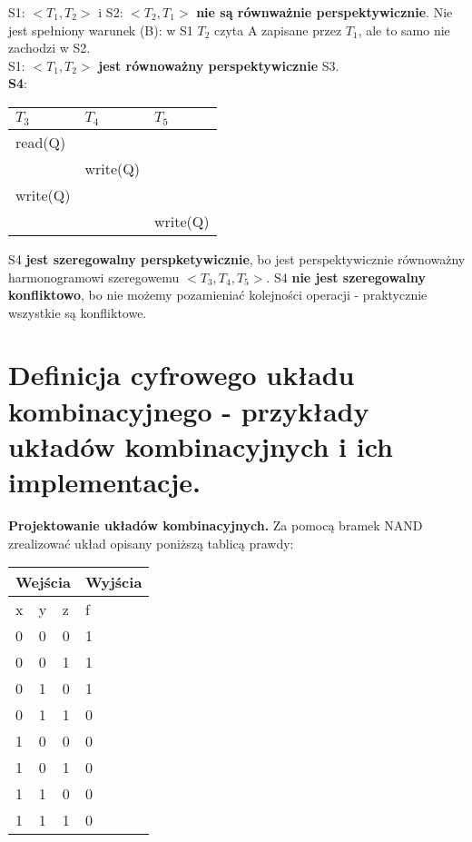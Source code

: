 \documentclass[main.tex]{subfiles}
\begin{document}
    S1: $<T_1, T_2>$ i S2: $<T_2, T_1>$ \textbf{nie są równważnie perspektywicznie}. Nie jest spełniony warunek (B):
    w S1 $T_2$ czyta A zapisane przez $T_1$, ale to samo nie zachodzi w S2.\\

    S1: $<T_1, T_2>$ \textbf{jest równoważny perspektywicznie} S3.\\

    \noindent \textbf{S4}:
    \begin{table}[H]
        \begin{center}
            \begin{tabular}{| p{4cm} | p{4cm} | p{4cm} |}
                \hline
                $T_3$ & $T_4$ & $T_5$\\
                \hline
                \hline
                read(Q) &&\\
                \hline
                & write(Q) &\\
                \hline
                write(Q) &&\\
                \hline
                && write(Q)\\
                \hline
            \end{tabular}
        \end{center}
    \end{table}

    S4 \textbf{jest szeregowalny perspketywicznie}, bo jest perspektywicznie równoważny harmonogramowi szeregowemu
    $<T_3, T_4, T_5>$. S4 \textbf{nie jest szeregowalny konfliktowo}, bo nie możemy pozamieniać kolejności operacji
    - praktycznie wszystkie są konfliktowe.

    \newpage

    \section{Definicja cyfrowego układu kombinacyjnego - przykłady układów kombinacyjnych i ich implementacje.}

    \begin{exercise}
        \textbf{Projektowanie układów kombinacyjnych.} Za pomocą bramek NAND zrealizować układ opisany poniższą tablicą
        prawdy:

        \begin{tabular}{| p{1cm} p{1cm} p{1cm} | p{2cm} |}
            \hline
            \multicolumn{3}{|c|}{Wejścia} & Wyjścia\\
            \hline
            x & y & z & f\\
            \hline
            0 & 0 & 0 & 1\\
            0 & 0 & 1 & 1\\
            0 & 1 & 0 & 1\\
            0 & 1 & 1 & 0\\
            1 & 0 & 0 & 0\\
            1 & 0 & 1 & 0\\
            1 & 1 & 0 & 0\\
            1 & 1 & 1 & 0\\
            \hline
        \end{tabular}
    \end{exercise}
\end{document}
